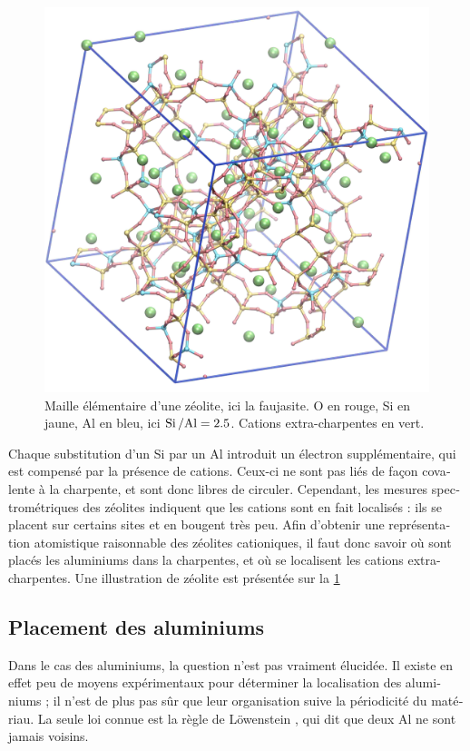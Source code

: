 \documentclass[thesis]{subfiles}
\begin{document}
\begin{otherlanguage}{french}
\begin{figure}[ht]
	\centering
	\includegraphics[width=0.8\linewidth]{figures/cations/FAU2.5_framework_Na.jpg}
	\caption{Maille élémentaire d'une zéolite, ici la faujasite. O en rouge, Si en jaune, Al en bleu, ici $\mbox{Si\,/Al} = 2.5$. Cations extra-charpentes  en vert.}\label{fig_FAU25}
\end{figure}

Chaque substitution d'un Si par un Al introduit un électron supplémentaire, qui est compensé par la présence de cations. Ceux-ci ne sont pas liés de façon covalente à la charpente, et sont donc libres de circuler. Cependant, les mesures spectrométriques des zéolites indiquent que les cations sont en fait localisés : ils se placent sur certains sites et en bougent très peu. Afin d'obtenir une représentation atomistique raisonnable des zéolites cationiques, il faut donc savoir où sont placés les aluminiums dans la charpentes, et où se localisent les cations extra-charpentes. Une illustration de zéolite est présentée sur la \cref{fig_FAU25}

\subsection{Placement des aluminiums}

Dans le cas des aluminiums, la question n'est pas vraiment élucidée. Il existe en effet peu de moyens expérimentaux pour déterminer la localisation des aluminiums ; il n'est de plus pas sûr que leur organisation suive la périodicité du matériau. La seule loi connue est la règle de L\"owenstein \autocite{Loewenstein}, qui dit que deux Al ne sont jamais voisins.


\end{otherlanguage}
\end{document}
